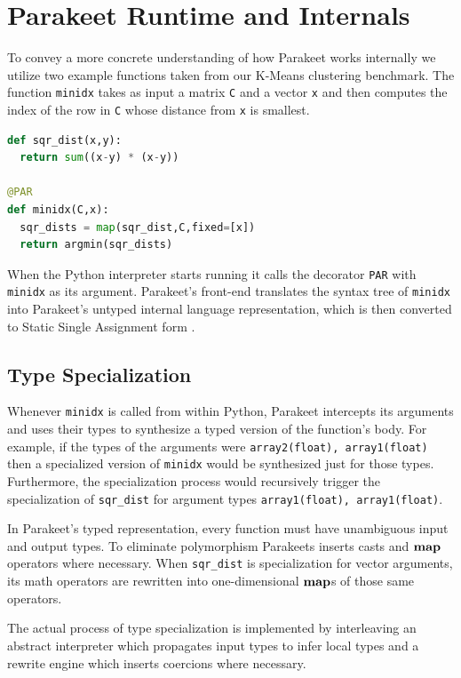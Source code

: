 \documentclass[10pt,twocolumn]{article}
\begin{document}
\section{Parakeet Runtime and Internals}
To convey a more concrete understanding of how Parakeet works internally we utilize two example functions taken from our K-Means clustering benchmark. The function \lstinline{minidx} takes as input a matrix \lstinline{C} and a vector \lstinline{x} and then computes the index of the row in \lstinline{C} whose distance from \lstinline{x} is smallest.

\begin{lstlisting}[language=Python,frame=single, label=MinIdx]
def sqr_dist(x,y):
  return sum((x-y) * (x-y))

@PAR
def minidx(C,x):
  sqr_dists = map(sqr_dist,C,fixed=[x])
  return argmin(sqr_dists)
\end{lstlisting}

When the Python interpreter starts running it calls the decorator \lstinline{PAR} with \lstinline{minidx} as its argument. Parakeet's front-end 
translates the syntax tree of \lstinline{minidx} into Parakeet's untyped internal language representation, which is then converted to Static Single Assignment form \cite{Cytr91}. 


\subsection{Type Specialization}
Whenever \lstinline{minidx} is called from within Python, Parakeet intercepts its arguments and uses their types to synthesize a typed version of the function's body. For example, if the types of the arguments were \lstinline{array2(float), array1(float)} then a specialized version of \lstinline{minidx} would be synthesized just for those types. Furthermore, the specialization process would recursively trigger the specialization of \lstinline{sqr_dist} for argument types \lstinline{array1(float), array1(float)}. 

In Parakeet's typed representation, every function must have unambiguous input and output types. To eliminate polymorphism Parakeets inserts casts and $\mbox{\textbf{map}}$ operators where necessary. When \lstinline{sqr_dist} is specialization for vector arguments, its math operators are rewritten into one-dimensional $\mbox{\textbf{map}}$s of those same operators. 

The actual process of type specialization is implemented by interleaving an abstract interpreter which propagates input types to infer local types and a rewrite engine which inserts coercions where necessary. 
\end{document}
